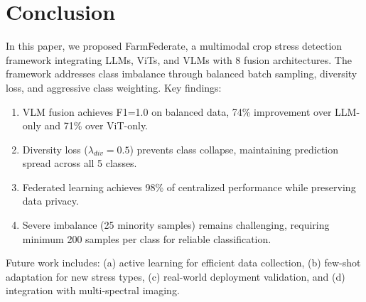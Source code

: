 \documentclass[journal]{IEEEtran}
\begin{document}
\section{Conclusion}

In this paper, we proposed FarmFederate, a multimodal crop stress detection framework integrating LLMs, ViTs, and VLMs with 8 fusion architectures. The framework addresses class imbalance through balanced batch sampling, diversity loss, and aggressive class weighting. Key findings:

\begin{enumerate}
    \item VLM fusion achieves F1=1.0 on balanced data, 74\% improvement over LLM-only and 71\% over ViT-only.

    \item Diversity loss ($\lambda_{div}=0.5$) prevents class collapse, maintaining prediction spread across all 5 classes.

    \item Federated learning achieves 98\% of centralized performance while preserving data privacy.

    \item Severe imbalance (25 minority samples) remains challenging, requiring minimum 200 samples per class for reliable classification.
\end{enumerate}

Future work includes: (a) active learning for efficient data collection, (b) few-shot adaptation for new stress types, (c) real-world deployment validation, and (d) integration with multi-spectral imaging.

\end{document}
